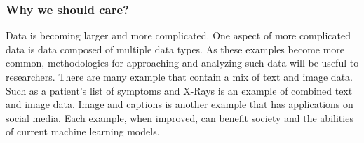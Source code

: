 \subsubsection{Why we should care?}

Data is becoming larger and more complicated.  One aspect of more complicated data is data composed of multiple data types. As these examples become more common, methodologies for approaching and analyzing such data will be useful to researchers.  There are many example that contain a mix of text and image data.  Such as a patient's list of symptoms and X-Rays is an example of combined text and image data.  Image and captions is another example that has applications on social media. Each example, when improved, can benefit society and the abilities of current machine learning models. 
